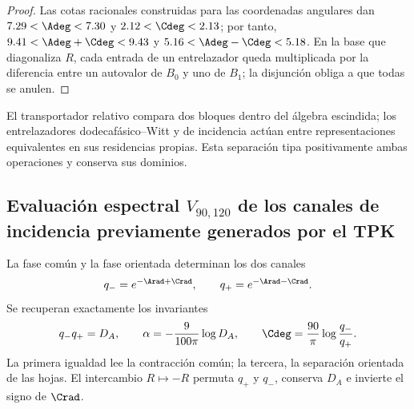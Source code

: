 \begin{proof}
Las cotas racionales construidas para las coordenadas angulares dan
\(7.29<\Adeg<7.30\) y \(2.12<\Cdeg<2.13\); por tanto,
\(9.41<\Adeg+\Cdeg<9.43\) y
\(5.16<\Adeg-\Cdeg<5.18\). En la base que diagonaliza \(R\), cada entrada
de un entrelazador queda multiplicada por la diferencia entre un autovalor
de \(B_0\) y uno de \(B_1\); la disjunción obliga a que todas se anulen.
\end{proof}

El transportador relativo compara dos bloques dentro del álgebra escindida;
los entrelazadores dodecafásico--Witt y de incidencia actúan entre
representaciones equivalentes en sus residencias propias. Esta separación
tipa positivamente ambas operaciones y conserva sus dominios.

\subsection{Evaluación espectral \texorpdfstring{\(V_{90,120}\)}{V_90,120} de los canales de incidencia previamente generados por el TPK}
\label{sec:s102:c38:6:3}


La fase común y la fase orientada determinan los dos canales
\[
q_-=e^{-\Arad+\Crad},
\qquad
q_+=e^{-\Arad-\Crad}.
\]
Se recuperan exactamente los invariantes
\[
q_-q_+=D_A,
\qquad
\alpha=-\frac9{100\pi}\log D_A,
\qquad
\Cdeg=\frac{90}{\pi}\log\frac{q_-}{q_+}.
\]
La primera igualdad lee la contracción común; la tercera, la separación
orientada de las hojas. El intercambio \(R\mapsto-R\) permuta
\(q_+\) y \(q_-\), conserva \(D_A\) e invierte el signo de \(\Crad\).

\label{sec:l9s102:qpm-posteriores}

